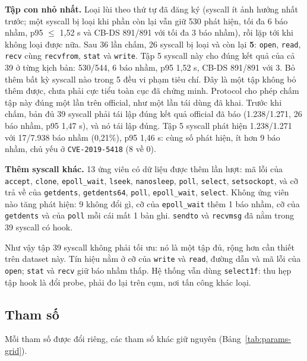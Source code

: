 \textbf{Tập con nhỏ nhất.} Loại lùi theo thứ tự đã đăng ký (syscall ít ảnh hưởng nhất trước; một syscall bị loại khi phần còn lại vẫn giữ 530 phát hiện, tối đa 6 báo nhầm, p95 $\leq$ 1,52 s và CB-DS 891/891 với tối đa 3 báo nhầm), rồi lặp tới khi không loại được nữa. Sau 36 lần chấm, 26 syscall bị loại và còn lại \textbf{5}: \texttt{open}, \texttt{read}, \texttt{recv} cùng \texttt{recvfrom}, \texttt{stat} và \texttt{write}. Tập 5 syscall này cho đúng kết quả của cả 39 ở từng kịch bản: 530/544, 6 báo nhầm, p95 1,52 s, CB-DS 891/891 với 3. Bỏ thêm bất kỳ syscall nào trong 5 đều vi phạm tiêu chí. Đây là một tập không bỏ thêm được, chưa phải cực tiểu toàn cục đã chứng minh. Protocol cho phép chấm tập này đúng một lần trên official, như một lần tái dùng đã khai. Trước khi chấm, bản đủ 39 syscall phải tái lập đúng kết quả official đã báo (1.238/1.271, 26 báo nhầm, p95 1,47 s), và nó tái lập đúng. Tập 5 syscall phát hiện 1.238/1.271 với 17/7.938 báo nhầm (0,21\%), p95 1,46 s: cùng số phát hiện, ít hơn 9 báo nhầm, chủ yếu ở \texttt{CVE-\allowbreak{}2019-\allowbreak{}5418} (8 về 0).

\textbf{Thêm syscall khác.} 13 ứng viên có dữ liệu được thêm lần lượt: mã lỗi của \texttt{accept}, \texttt{clone}, \texttt{epoll\_wait}, \texttt{lseek}, \texttt{nanosleep}, \texttt{poll}, \texttt{select}, \texttt{setsockopt}, và cỡ trả về của \texttt{getdents}, \texttt{getdents64}, \texttt{poll}, \texttt{epoll\_wait}, \texttt{select}. Không ứng viên nào tăng phát hiện: 9 không đổi gì, cỡ của \texttt{epoll\_wait} thêm 1 báo nhầm, cỡ của \texttt{getdents} và của \texttt{poll} mỗi cái mất 1 bản ghi. \texttt{sendto} và \texttt{recvmsg} đã nằm trong 39 syscall có hook.

Như vậy tập 39 syscall không phải tối ưu: nó là một tập đủ, rộng hơn cần thiết trên dataset này. Tín hiệu nằm ở cỡ của \texttt{write} và \texttt{read}, đường dẫn và mã lỗi của \texttt{open}; \texttt{stat} và \texttt{recv} giữ báo nhầm thấp. Hệ thống vẫn dùng \texttt{select1f}: thu hẹp tập hook là đổi probe, phải đo lại trên cụm, nơi tấn công khác loại.

\subsection{Tham số}

Mỗi tham số được đổi riêng, các tham số khác giữ nguyên (Bảng~\ref{tab:params-grid}).

